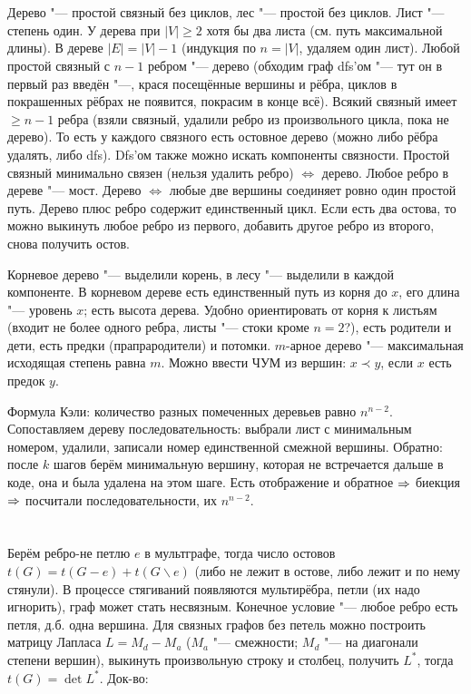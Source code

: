 \section{} %
Дерево "--- простой связный без циклов, лес "--- простой без циклов.
Лист "--- степень один.
У дерева при $|V|\ge 2$ хотя бы два листа (см. путь максимальной длины).
В дереве $|E|=|V|-1$ (индукция по $n=|V|$, удаляем один лист).
Любой простой связный с $n-1$ ребром "--- дерево (обходим граф dfs'ом "--- тут он в первый раз введён "---, крася посещённые вершины и рёбра, циклов в покрашенных
рёбрах не появится, покрасим в конце всё).
Всякий связный имеет $\ge n-1$ ребра (взяли связный, удалили ребро из произвольного цикла, пока не дерево).
То есть у каждого связного есть остовное дерево (можно либо рёбра удалять, либо dfs).
Dfs'ом также можно искать компоненты связности.
Простой связный минимально связен (нельзя удалить ребро) $\iff$ дерево.
Любое ребро в дереве "--- мост.
Дерево $\iff$ любые две вершины соединяет ровно один простой путь.
Дерево плюс ребро содержит единственный цикл.
Если есть два остова, то можно выкинуть любое ребро из первого, добавить другое ребро из второго, снова получить остов.

Корневое дерево "--- выделили корень, в лесу "--- выделили в каждой компоненте.
В корневом дереве есть единственный путь из корня до $x$, его длина "--- уровень $x$;
есть высота дерева.
Удобно ориентировать от корня к листьям (входит не более одного ребра, листы "--- стоки \TODO кроме $n=2$?),
есть родители и дети, есть предки (прапрародители) и потомки.
$m$-арное дерево "--- максимальная исходящая степень равна $m$.
Можно ввести ЧУМ из вершин: $x \prec y$, если $x$ есть предок $y$.

Формула Кэли: количество разных помеченных деревьев равно $n^{n-2}$.
Сопоставляем дереву последовательность: выбрали лист с минимальным номером, удалили,
записали номер единственной смежной вершины.
Обратно: после $k$ шагов берём минимальную вершину, которая не встречается дальше в коде, она и была
удалена на этом шаге.
Есть отображение и обратное $\Rightarrow$ биекция $\Rightarrow$ посчитали последовательности, их $n^{n-2}$.

\section{} %
Берём ребро-не петлю $e$ в мультграфе, тогда число остовов $t(G)=t(G-e)+t(G\backslash e)$ (либо не лежит в остове, либо лежит и по нему стянули).
В процессе стягиваний появляются мультирёбра, петли (их надо игнорить), граф может стать несвязным.
Конечное условие "--- любое ребро есть петля, д.б. одна вершина.
Для связных графов без петель можно построить матрицу Лапласа $L=M_d-M_a$ ($M_a$ "--- смежности; $M_d$ "--- на диагонали степени вершин),
выкинуть произвольную строку и столбец, получить $L^*$, тогда $t(G)=\det L^*$.
Док-во:

